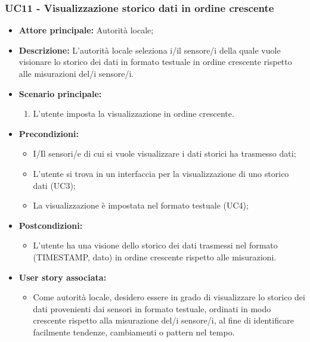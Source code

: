 \subsubsection{UC11 - Visualizzazione storico dati in ordine crescente}
\begin{itemize}
    \item \textbf{Attore principale:} Autorità locale;
    \item \textbf{Descrizione:} L’autorità locale seleziona i/il sensore/i della quale vuole visionare lo storico dei dati in formato testuale in ordine crescente rispetto alle misurazioni del/i sensore/i.
    \item \textbf{Scenario principale:}
          \begin{enumerate}
              \item L'utente imposta la visualizzazione in ordine crescente.
          \end{enumerate}
    \item \textbf{Precondizioni:}
          \begin{itemize}
              \item  I/Il sensori/e di cui si vuole visualizzare i dati storici ha trasmesso dati;
              \item  L'utente si trova in un interfaccia per la visualizzazione di uno storico dati (UC3);
              \item La visualizzazione è impostata nel formato testuale (UC4);
          \end{itemize}
    \item \textbf{Postcondizioni:}
          \begin{itemize}
              \item  L'utente ha una visione dello storico dei dati trasmessi nel formato (TIMESTAMP, dato) in ordine crescente rispetto alle misurazioni.
          \end{itemize}
    \item \textbf{User story associata:}
          \begin{itemize}
              \item Come autorità locale, desidero essere in grado di visualizzare lo storico dei dati provenienti dai sensori in formato testuale, ordinati in modo crescente rispetto alla misurazione del/i sensore/i, al fine di identificare facilmente tendenze, cambiamenti o pattern nel tempo.
          \end{itemize}
\end{itemize}